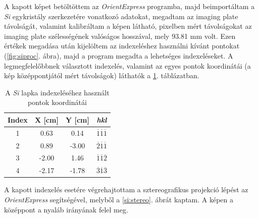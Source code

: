 \documentclass[12pt,a4paper]{article}
\begin{document}
\newline
A kapott képet betöltöttem az \emph{OrientExpress} programba, majd beimportáltam a \emph{Si} egykristály szerkezetére vonatkozó adatokat, megadtam az imaging plate távolságát, valamint kalibráltam a képen látható, pixelben mért távolságokat az imaging plate szélességének valóságos hosszával, mely 93.81 mm volt. Ezen értékek megadása után kijelöltem az indexeléshez használni kívánt pontokat (\ref{fig:siproc}. ábra), majd a program megadta a lehetséges indexeléseket. A legmegfelelőbbnek választott indexelés, valamint az egyes pontok koordinátái (a kép középpontjától mért távolságok) láthatók a \ref{tab:si}. táblázatban.\\
\begin{table}[!h]
\begin{center}
\begin{tabular}{|c|c|c|c|}
\hline
Index & X [cm] & Y [cm] & \emph{hkl} \\
\hline
1 & 0.63 & 0.14 & ${\overline{1}\overline{1}\overline{1}}$\\
\hline
2 & 0.89 & -3.00 & ${\overline{2}\overline{1}\overline{1}}$\\
\hline
3 & -2.00 & 1.46 & ${\overline{1}\overline{1}\overline{2}}$\\
\hline
4 & -2.17 & -1.78 & ${\overline{3}\overline{1}\overline{3}}$\\
\hline
\end{tabular}
\caption{A \emph{Si} lapka indexeléséhez használt pontok koordinátái}
\label{tab:si}
\end{center}
\end{table}
\newline
A kapott indexelés esetére végrehajtottam a sztereografikus projekció lépést az \emph{OrientExpress} segítségével, melyből a \ref{si:stereo}. ábrát kaptam. A képen a középpont a nyaláb irányának felel meg.\\
\end{document}
